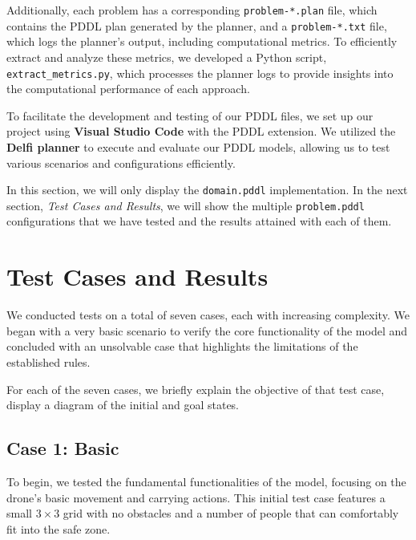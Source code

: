 \documentclass{article}
\begin{document}
Additionally, each problem has a corresponding \texttt{problem-*.plan} file, which contains the PDDL plan generated by the planner, and a \texttt{problem-*.txt} file, which logs the planner's output, including computational metrics. To efficiently extract and analyze these metrics, we developed a Python script, \texttt{extract\_metrics.py}, which processes the planner logs to provide insights into the computational performance of each approach.

To facilitate the development and testing of our PDDL files, we set up our project using \textbf{Visual Studio Code} with the PDDL extension. We utilized the \textbf{Delfi planner} to execute and evaluate our PDDL models, allowing us to test various scenarios and configurations efficiently.

In this section, we will only display the \texttt{domain.pddl} implementation. In the next section, \textit{Test Cases and Results}, we will show the multiple \texttt{problem.pddl} configurations that we have tested and the results attained with each of them.


\section{Test Cases and Results}

We conducted tests on a total of seven cases, each with increasing complexity. We began with a very basic scenario to verify the core functionality of the model and concluded with an unsolvable case that highlights the limitations of the established rules.

For each of the seven cases, we briefly explain the objective of that test case, display a diagram of the initial and goal states.


\subsection{Case 1: Basic}

To begin, we tested the fundamental functionalities of the model, focusing on the drone's basic movement and carrying actions. This initial test case features a small \(3 \times 3\) grid with no obstacles and a number of people that can comfortably fit into the safe zone.
\end{document}
